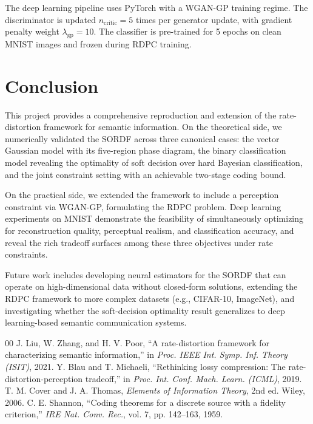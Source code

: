 \documentclass[conference]{IEEEtran}
\begin{document}
The deep learning pipeline uses PyTorch with a WGAN-GP training regime. The discriminator is updated $n_{\text{critic}} = 5$ times per generator update, with gradient penalty weight $\lambda_{\text{gp}} = 10$. The classifier is pre-trained for 5 epochs on clean MNIST images and frozen during RDPC training.

\section{Conclusion}

This project provides a comprehensive reproduction and extension of the rate-distortion framework for semantic information. On the theoretical side, we numerically validated the SORDF across three canonical cases: the vector Gaussian model with its five-region phase diagram, the binary classification model revealing the optimality of soft decision over hard Bayesian classification, and the joint constraint setting with an achievable two-stage coding bound.

On the practical side, we extended the framework to include a perception constraint via WGAN-GP, formulating the RDPC problem. Deep learning experiments on MNIST demonstrate the feasibility of simultaneously optimizing for reconstruction quality, perceptual realism, and classification accuracy, and reveal the rich tradeoff surfaces among these three objectives under rate constraints.

Future work includes developing neural estimators for the SORDF that can operate on high-dimensional data without closed-form solutions, extending the RDPC framework to more complex datasets (e.g., CIFAR-10, ImageNet), and investigating whether the soft-decision optimality result generalizes to deep learning-based semantic communication systems.

\begin{thebibliography}{00}
 J. Liu, W. Zhang, and H. V. Poor, ``A rate-distortion framework for characterizing semantic information,'' in \textit{Proc. IEEE Int. Symp. Inf. Theory (ISIT)}, 2021.
 Y. Blau and T. Michaeli, ``Rethinking lossy compression: The rate-distortion-perception tradeoff,'' in \textit{Proc. Int. Conf. Mach. Learn. (ICML)}, 2019.
 T. M. Cover and J. A. Thomas, \textit{Elements of Information Theory}, 2nd ed. Wiley, 2006.
 C. E. Shannon, ``Coding theorems for a discrete source with a fidelity criterion,'' \textit{IRE Nat. Conv. Rec.}, vol. 7, pp. 142--163, 1959.
\end{thebibliography}
\end{document}
